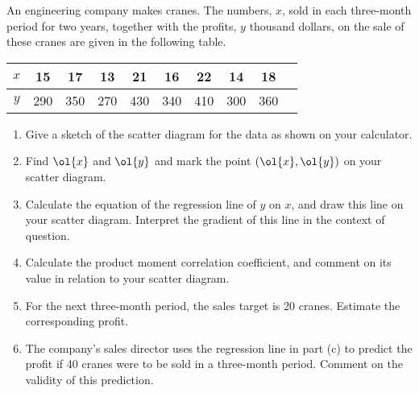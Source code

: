 \begin{problem}
    An engineering company makes cranes. The numbers, $x$, sold in each three-month period for two years, together with the profits, $y$ thousand dollars, on the sale of these cranes are given in the following table.

    \begin{table}[H]
        \centering
        \begin{tabular}{|c|c|c|c|c|c|c|c|c|c}
            \hline
            $x$ & 15 & 17 & 13 & 21 & 16 & 22 & 14 & 18 \\ \hline
            $y$ & 290 & 350 & 270 & 430 & 340 & 410 & 300 & 360\\ \hline
        \end{tabular}
    \end{table}

    \begin{enumerate}
        \item Give a sketch of the scatter diagram for the data as shown on your calculator.
        \item Find $\ol{x}$ and $\ol{y}$ and mark the point $(\ol{x},\ol{y})$ on your scatter diagram.
        \item Calculate the equation of the regression line of $y$ on $x$, and draw this line on your scatter diagram. Interpret the gradient of this line in the context of question.
        \item Calculate the product moment correlation coefficient, and comment on its value in relation to your scatter diagram.
        \item For the next three-month period, the sales target is 20 cranes. Estimate the corresponding profit.
        \item The company's sales director uses the regression line in part (c) to predict the profit if 40 cranes were to be sold in a three-month period. Comment on the validity of this prediction.
    \end{enumerate}
\end{problem}
